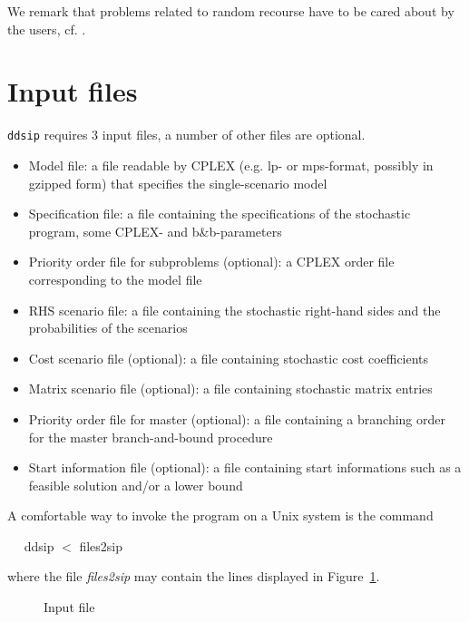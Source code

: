 \documentclass[11pt,draft]{article}
\newcommand{\+}{{\ti{+}}}
\newcommand{\1}{{\ti{1}}}
\begin{document}
We remark that problems related to random recourse have to be cared about by the users, cf. \cite{walk}.

\newpage
\section{Input files} \label{S:INP}

\texttt{ddsip} requires 3 input files, a number of other files are optional. \\[-1.5em]
\begin{itemize}\topsep0em\itemsep0.2em
\item Model file: a file readable by CPLEX (e.g. lp- or mps-format, possibly in gzipped form) that specifies the 
single-scenario model
\item Specification file: a file containing the specifications of the
stochastic program, some CPLEX- and b\&b-parameters
\item Priority order file for subproblems (optional): a CPLEX order file corresponding to the
model file
\item RHS scenario file: a file containing the stochastic right-hand sides
and the probabilities of the scenarios 
\item Cost scenario file (optional): a file containing stochastic cost
coefficients 
\item Matrix scenario file (optional): a file containing stochastic
matrix entries
\item Priority order file for master (optional): a file containing a branching order for the master branch-and-bound
procedure  
\item Start information file (optional): a file containing start
informations such as a feasible solution and/or a lower bound
\end{itemize}
A comfortable way to invoke the program on a Unix system is the command 
\vspace{0.2cm}

\noindent
~~ ddsip $<$ files2sip
\vspace{0.2cm}

\noindent
where the file {\it files2sip} may contain the lines displayed in Figure~\ref{F:F2S}.
%
\begin{figure}[ht]
\begin{center}
\end{center} \caption{Input file} \label{F:F2S}
\end{figure}
%
\end{document}
